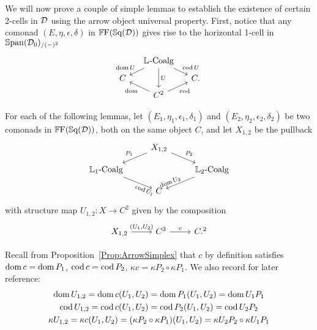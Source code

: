 We will now prove a couple of simple lemmas to establish the existence of certain 2-cells in $\mathcal{D}$ using the arrow object universal property. First, notice that any comonad $(E,\eta,\epsilon,\delta)$ in $\mathbb{F}\mathrm{F}(\mathbb{S}\mathrm{q}(\mathcal{D}))$ gives rise to the horizontal 1-cell in $\mathbb{S}\mathrm{pan}(\mathcal{D}_0)_{/(-)^2}$
\[
\begin{tikzcd}[row sep=tiny,column sep=small]
	{} & \LCoalg \dlar[swap]{\dom U} \drar{\cod U} \ar{dd}{U} & \\
	C && C. \\
	& C^2 \ular{\dom} \urar[swap]{\cod}
\end{tikzcd}
\]

For each of the following lemmas, let $(E_1,\eta_1,\epsilon_1,\delta_1)$ and $(E_2,\eta_2,\epsilon_2,\delta_2)$ be two comonads in $\mathbb{F}\mathrm{F}(\mathbb{S}\mathrm{q}(\mathcal{D}))$, both on the same object $C$, and let $X_{1,2}$ be the pullback
\[
\begin{tikzcd}[row sep=small]
	{} & X_{1,2} \dlar[swap]{P_1} \drar{P_2}
	& \\
	\LCoalg[1] \drar[sloped,pos=.8,swap]{\cod U_1}
		&& \LCoalg[2] \dlar[sloped,pos=.8]{\dom U_2} \\
	& C &
\end{tikzcd}
\]
with structure map $U_{1,2}\colon X\to C^2$ given by the composition
\[
\begin{tikzcd}
	X_{1,2} \rar{(U_1,U_2)} & C^3 \rar{c} & C.^2
\end{tikzcd}
\]

Recall from Proposition~\ref{Prop:ArrowSimplex} that $c$ by definition satisfies $\operatorname{dom} c=\operatorname{dom} P_1$, $\operatorname{cod} c=\operatorname{cod} P_2$, $\kappa c=\kappa P_2\circ\kappa P_1$.
We also record for later reference:
\begin{gather}
	\operatorname{dom} U_{1,2} = \operatorname{dom} c(U_1,U_2) = \operatorname{dom} P_1(U_1,U_2) = \operatorname{dom} U_1P_1
	\label{Eq:domU12} \\
	\operatorname{cod} U_{1,2} = \operatorname{cod} c(U_1,U_2) = \operatorname{cod} P_2(U_1,U_2) = \operatorname{cod} U_2P_2 
	\label{Eq:codU12} \\
	\kappa U_{1,2} = \kappa c(U_1,U_2) = (\kappa P_2\circ\kappa P_1)(U_1,U_2) = \kappa U_2P_2\circ\kappa U_1P_1
	\label{Eq:kappaU12}
\end{gather}


